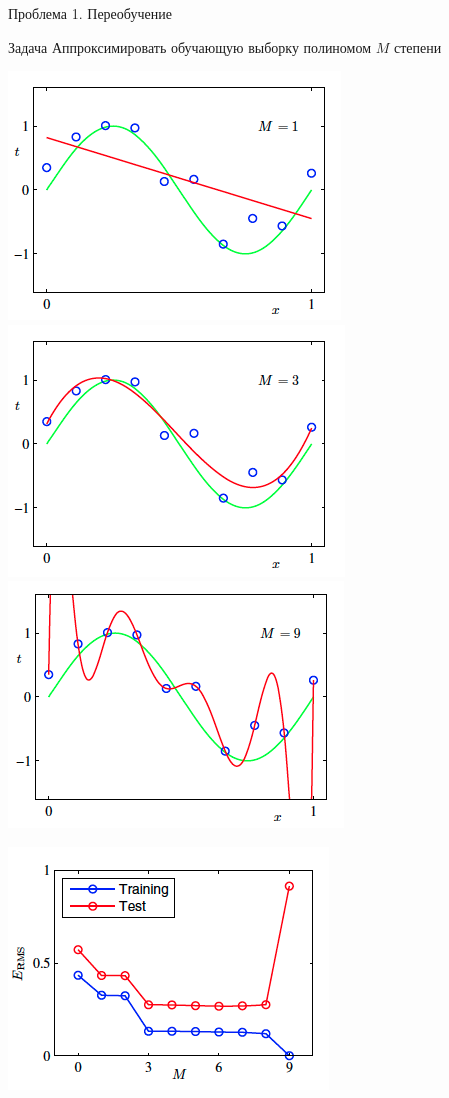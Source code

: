 \documentclass[10pt,a4paper]{beamer}
\begin{document}
\begin{frame}{Проблема 1. Переобучение}

\begin{block}{Задача}
Аппроксимировать обучающую выборку полиномом $M$ степени
\end{block}

\begin{center}
\includegraphics[scale=0.3]{images/m1.png}
\includegraphics[scale=0.3]{images/m2.png}
\includegraphics[scale=0.3]{images/m3.png}

\includegraphics[scale=0.3]{images/of.png}
\end{center}

\end{frame}
\end{document}
